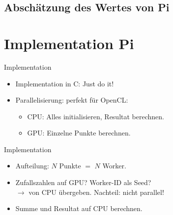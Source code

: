\documentclass{beamer}
\begin{document}
\subsection{Abschätzung des Wertes von Pi}

\section[Implementation]{Implementation Pi}
\begin{frame}{Implementation}
	\begin{itemize}
		\item Implementation in C: Just do it!
		\item Parallelisierung: perfekt für OpenCL:
			\begin{itemize}
				\item<2-> CPU: Alles initialisieren, Resultat berechnen.
				\item<2-> GPU: Einzelne Punkte berechnen.
			\end{itemize}
	\end{itemize}
\end{frame}
\begin{frame}{Implementation}
	\begin{itemize}
		\item Aufteilung: $N$ Punkte $=$ $N$ Worker.
		\item Zufallszahlen auf GPU? Worker-ID als Seed? \\
		$\rightarrow$ von CPU übergeben. Nachteil: nicht parallel!
		\item Summe und Resultat auf CPU berechnen.
	\end{itemize}
\end{frame}
\end{document}
